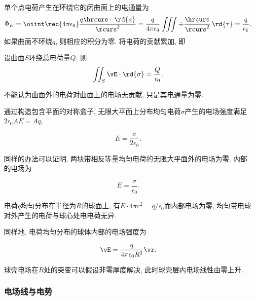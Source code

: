 \documentclass[../Electromagnetism.tex]{subfiles}
\begin{document}
单个点电荷产生在环绕它的闭曲面上的电通量为
\[ \Phi_E = \oiint \rec{4\pi\epsilon_0}\frac{q\hrcurs\cdot\,\rd{a}}{\rcurs^2} = \frac{q}{4\pi\epsilon_0} \iiint \div\frac{\hrcurs}{\rcurs^2}\,\rd{\tau} = \frac{q}{\epsilon_0}. \]
如果曲面不环绕$q$, 则相应的积分为零. 将电荷的贡献累加, 即
\begin{finale}
	\begin{corollary}[Gau\ss 定律]
		\label{coll:Gauss定律}
		设曲面$S$环绕总电荷量$Q$, 则
		\[ \iint_S \vE\cdot\rd{\sigma} = \frac{Q}{\epsilon_0}. \]
	\end{corollary}
\end{finale}
\begin{pitfall}
	不能认为曲面外的电荷对曲面上的电场无贡献, 只是其电通量为零.
\end{pitfall}
\begin{ex}
	\label{ex:无限大平面上均匀分布的电荷产生的电场}
	通过构造包含平面的对称盒子, 无限大平面上分布均匀电荷$\sigma$产生的电场强度满足$2\epsilon_0 AE = Aq$,
	\begin{finale}
		\[  E = \frac{\sigma}{2\epsilon_0}. \]
	\end{finale}
\end{ex}
\begin{ex}
	\label{ex:平行无限大平面上均匀分布的异号电荷产生的电场}
	同样的办法可以证明, 两块带相反等量均匀电荷的无限大平面外的电场为零, 内部的电场为
	\begin{finale}
		\[ E = \frac{\sigma}{\epsilon_0}. \]
	\end{finale}
\end{ex}
\begin{ex}
	\label{ex:均匀带电球面的电场}
	电荷$q$均匀分布在半径为$R$的球面上, 有$E\cdot 4\pi r^2 = q/\epsilon_0$而内部电场为零, 均匀带电球对外产生的电荷与球心处电电荷无异.
\end{ex}
\begin{ex}
	同样地, 电荷均匀分布的球体内部的电场强度为
	\begin{finale}
		\[ \vE = \frac{q}{4\pi\epsilon_0 R^3}\vr. \]
	\end{finale}
\end{ex}
\begin{remark}
	球壳电场在$R$处的突变可以假设非零厚度解决, 此时球壳层内电场线性由零上升.
\end{remark}


\subsubsection{电场线与电势} %
\label{ssub:电场线与电势}
\end{document}
